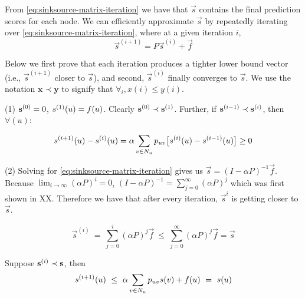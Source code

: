 
From \cref{eq:sinksource-matrix-iteration} we have that $\vec{s}$ contains the final prediction scores for each node. We can efficiently approximate $\vec{s}$ by repeatedly iterating over \cref{eq:sinksource-matrix-iteration}, where at a given iteration $i$, 
\begin{equation}
    \vec{s}^{(i+1)} = P\vec{s}^{(i)} + \vec{f}
\end{equation}

Below we first prove that each iteration produces a tighter lower bound vector (i.e., $\vec{s}^{(i+1)}$ closer to $\vec{s}$), and second, $\vec{s}^{(i)}$ finally converges to $\vec{s}$. 
We use the notation $\mathbf{x} \prec \mathbf{y}$ to signify that $\forall_i, x(i) \leq y(i)$.

(1) $\mathbf{s}^{(0)} = 0$, $s^{(1)}(u) = f(u)$. Clearly $\mathbf{s}^{(0)} \prec \mathbf{s}^{(1)}$. Further, if $\mathbf{s}^{(i-1)} \prec \mathbf{s}^{(i)}$, then $\forall(u)$:

\begin{equation}
s^{(i+1)}(u) - s^{(i)}(u) = \alpha \sum\limits_{v\in{}N_u} p_{uv}\big[ s^{(i)}(u) - s^{(i-1)}(u)\big] \ge 0
\end{equation}

(2) Solving for \cref{eq:sinksource-matrix-iteration} gives us $\vec{s} = (I - \alpha{}P)^{-1}\vec{f}$. 
Because $\lim_{i\to\infty}(\alpha{}P)^{i} = 0$, $(I - \alpha{}P)^{-1} = \sum\limits_{j=0}^{\infty}(\alpha{}P)^j$ which was first shown in XX.  Therefore we have that after every iteration, $\vec{s}^{i}$ is getting closer to $\vec{s}$.

\begin{equation}
\vec{s}^{(i)} \ = \ \sum\limits_{j=0}^{i}(\alpha{}P)^j \vec{f} \ \le \ \sum\limits_{j=0}^{\infty}(\alpha{}P)^j \vec{f} = \vec{s}
\end{equation}

Suppose $\mathbf{s}^{(i)} \prec \mathbf{s}$, then 
\begin{equation}
s^{(i+1)}(u) \ \le \ \alpha \sum\limits_{v \in{} N_u} p_{uv}s(v) + f(u) \ = \ s(u)
\end{equation}

